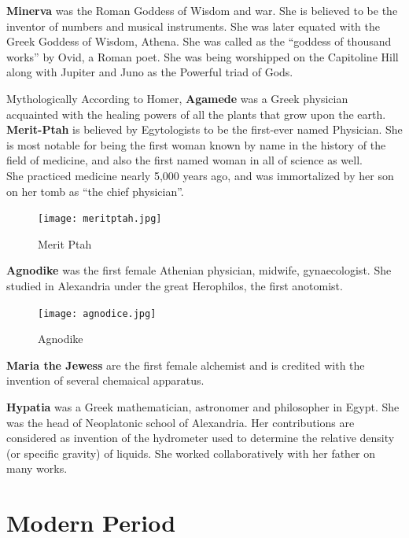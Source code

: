 \documentclass[a4paper,10pt]{article}
\begin{document}
\newblock
\textbf{Minerva} was the Roman Goddess of Wisdom and war. She is believed to be the inventor of numbers and musical instruments. She was later equated with the Greek Goddess of Wisdom, Athena. She was called as the “goddess of thousand works” by Ovid, a Roman poet. She was being worshipped on the Capitoline Hill along with Jupiter and Juno as the Powerful triad of Gods.

\newblock
Mythologically According to Homer, \textbf{Agamede} was a Greek physician acquainted with the healing powers of all the plants that grow upon the earth.\\

\newblock
\textbf{Merit-Ptah} is believed by Egytologists to be the first-ever named Physician. She is most notable for being the first woman known by name in the history of the field of medicine, and also the first named woman in all of science as well.\\

She practiced medicine nearly 5,000 years ago, and was immortalized by her son on her tomb as “the chief physician”\cite{merit}.
\begin{center}
\begin{figure}[h]
\centering
 \texttt{[image: meritptah.jpg]}
 \caption{Merit Ptah}
\end{figure}
\end{center}

\newblock
\textbf{Agnodike} was the first female Athenian physician, midwife, gynaecologist. She studied in Alexandria under the great Herophilos, the first anotomist.

\begin{center}
\begin{figure}[h]
\centering
 \texttt{[image: agnodice.jpg]}
 \caption{Agnodike}
\end{figure}
\end{center}

\newblock
\textbf{Maria the Jewess} are the first female alchemist and is credited with the invention of several chemaical apparatus.

\newblock
\textbf{Hypatia} was a Greek mathematician, astronomer and philosopher in Egypt. She was the head of Neoplatonic school of Alexandria. Her contributions are considered as invention of the hydrometer used to determine the relative density (or specific gravity) of liquids. She worked collaboratively with her father on many works.\\

\section{Modern Period}
\end{document}
